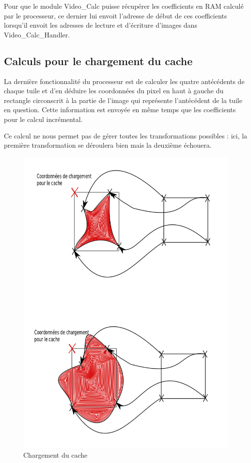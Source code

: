 \documentclass[a4paper,12pt]{report}
\begin{document}
{{{Pour que le module Video\_Calc puisse récupérer les coefficients en RAM calculé par le processeur, ce dernier lui envoit l'adresse de début de ces coefficients lorsqu'il envoit les adresses de lecture et d'écriture d'images dans Video\_Calc\_Handler.
}

			\subsection*{Calculs pour le chargement du cache}
{La dernière fonctionnalité du processeur est de calculer les quatre antécédents de chaque tuile et d'en déduire les coordonnées du pixel en haut à gauche du rectangle circonscrit à la partie de l'image qui représente l'antécédent de la tuile en question.
Cette information est envoyée en même temps que les coefficients pour le calcul incrémental.

Ce calcul ne nous permet pas de gérer toutes les transformations possibles : ici, la première transformation se déroulera bien mais la deuxième échouera.
\begin{figure}[!h]
	\centering
	\includegraphics[scale = 0.3]{cache_proc.png}
	\caption{Chargement du cache}
\end{figure}

}}}
\end{document}
